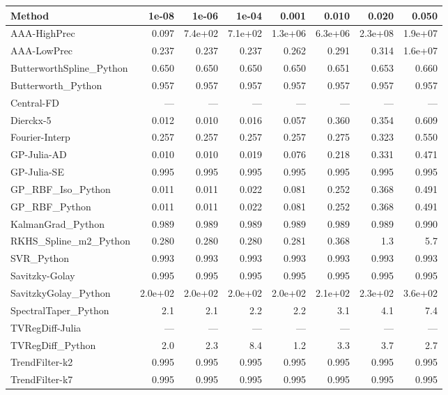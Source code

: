 \documentclass[10pt]{article}
\begin{document}
\begin{longtable}{lrrrrrrr}
\toprule
\textbf{Method} & \textbf{1e-08} & \textbf{1e-06} & \textbf{1e-04} & \textbf{0.001} & \textbf{0.010} & \textbf{0.020} & \textbf{0.050} \\
\midrule
\endhead
AAA-HighPrec & 0.097 & 7.4e+02 & 7.1e+02 & 1.3e+06 & 6.3e+06 & 2.3e+08 & 1.9e+07 \\
AAA-LowPrec & 0.237 & 0.237 & 0.237 & 0.262 & 0.291 & 0.314 & 1.6e+07 \\
ButterworthSpline\_Python & 0.650 & 0.650 & 0.650 & 0.650 & 0.651 & 0.653 & 0.660 \\
Butterworth\_Python & 0.957 & 0.957 & 0.957 & 0.957 & 0.957 & 0.957 & 0.957 \\
Central-FD & --- & --- & --- & --- & --- & --- & --- \\
Dierckx-5 & 0.012 & 0.010 & 0.016 & 0.057 & 0.360 & 0.354 & 0.609 \\
Fourier-Interp & 0.257 & 0.257 & 0.257 & 0.257 & 0.275 & 0.323 & 0.550 \\
GP-Julia-AD & 0.010 & 0.010 & 0.019 & 0.076 & 0.218 & 0.331 & 0.471 \\
GP-Julia-SE & 0.995 & 0.995 & 0.995 & 0.995 & 0.995 & 0.995 & 0.995 \\
GP\_RBF\_Iso\_Python & 0.011 & 0.011 & 0.022 & 0.081 & 0.252 & 0.368 & 0.491 \\
GP\_RBF\_Python & 0.011 & 0.011 & 0.022 & 0.081 & 0.252 & 0.368 & 0.491 \\
KalmanGrad\_Python & 0.989 & 0.989 & 0.989 & 0.989 & 0.989 & 0.989 & 0.990 \\
RKHS\_Spline\_m2\_Python & 0.280 & 0.280 & 0.280 & 0.281 & 0.368 & 1.3 & 5.7 \\
SVR\_Python & 0.993 & 0.993 & 0.993 & 0.993 & 0.993 & 0.993 & 0.993 \\
Savitzky-Golay & 0.995 & 0.995 & 0.995 & 0.995 & 0.995 & 0.995 & 0.995 \\
SavitzkyGolay\_Python & 2.0e+02 & 2.0e+02 & 2.0e+02 & 2.0e+02 & 2.1e+02 & 2.3e+02 & 3.6e+02 \\
SpectralTaper\_Python & 2.1 & 2.1 & 2.2 & 2.2 & 3.1 & 4.1 & 7.4 \\
TVRegDiff-Julia & --- & --- & --- & --- & --- & --- & --- \\
TVRegDiff\_Python & 2.0 & 2.3 & 8.4 & 1.2 & 3.3 & 3.7 & 2.7 \\
TrendFilter-k2 & 0.995 & 0.995 & 0.995 & 0.995 & 0.995 & 0.995 & 0.995 \\
TrendFilter-k7 & 0.995 & 0.995 & 0.995 & 0.995 & 0.995 & 0.995 & 0.995 \\

\end{longtable}
\end{document}
